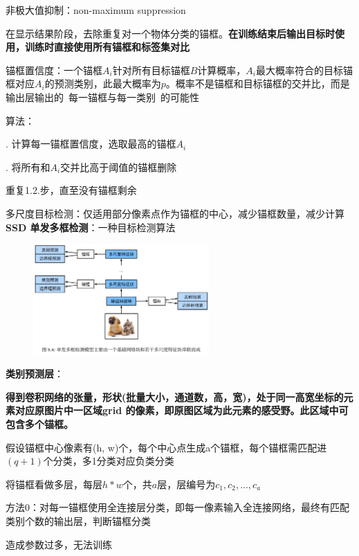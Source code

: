 \documentclass[UTF8]{ctexart}
\begin{document}
  非极大值抑制：non-maximum suppression

  \quad 在显示结果阶段，去除重复对一个物体分类的锚框。\textbf{在训练结束后输出目标时使用，训练时直接使用所有锚框和标签集对比}

  \quad 锚框置信度：一个锚框$A_i$针对所有目标锚框$B$计算概率，$A_i$最大概率符合的目标锚框对应$A_i$的预测类别，此最大概率为$p$。概率不是锚框和目标锚框的交并比，而是输出层输出的\ 每一锚框与每一类别\ 的可能性

  \quad 算法：

  \quad {}. 计算每一锚框置信度，选取最高的锚框$A_i$

  \quad {}. 将所有和$A_i$交并比高于阈值的锚框删除

  \quad \quad 重复1.2.步，直至没有锚框剩余

  多尺度目标检测：仅适用部分像素点作为锚框的中心，减少锚框数量，减少计算\\
\textbf{SSD 单发多框检测}：一种目标检测算法

  \begin{figure}[H] %
    \centering %
    \includegraphics[width=0.6\textwidth]{note_images/SSD_archi.png} %
  \end{figure}

  \textbf{类别预测层}：

  \quad \textbf{得到卷积网络的张量，形状(批量大小，通道数，高，宽)，处于同一高宽坐标的元素对应原图片中一区域grid 的像素，即原图区域为此元素的感受野。此区域中可包含多个锚框。}
    
  \quad 假设锚框中心像素有(h, w)个，每个中心点生成a个锚框，每个锚框需匹配进$(q+1)$个分类，多1分类对应负类分类

  \quad \quad 将锚框看做多层，每层$h*w$个，共$a$层，层编号为$c_1, c_2, ..., c_a$

  \quad 方法0：对每一锚框使用全连接层分类，即每一像素输入全连接网络，最终有匹配类别个数的输出层，判断锚框分类

  \quad \quad 造成参数过多，无法训练
\end{document}
